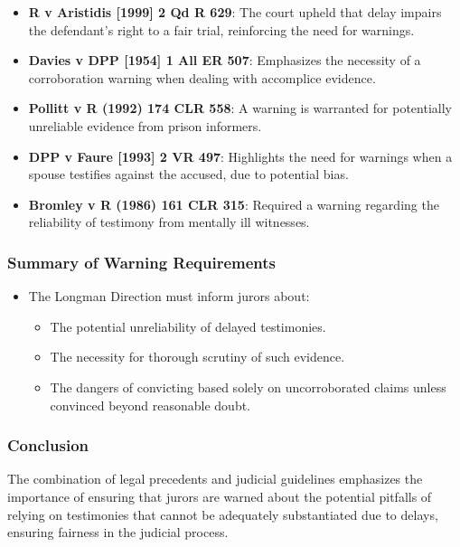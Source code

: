 \begin{itemize}
\item
  \textbf{R v Aristidis {[}1999{]} 2 Qd R 629}: The court upheld that
  delay impairs the defendant's right to a fair trial, reinforcing the
  need for warnings.
\item
  \textbf{Davies v DPP {[}1954{]} 1 All ER 507}: Emphasizes the
  necessity of a corroboration warning when dealing with accomplice
  evidence.
\item
  \textbf{Pollitt v R (1992) 174 CLR 558}: A warning is warranted for
  potentially unreliable evidence from prison informers.
\item
  \textbf{DPP v Faure {[}1993{]} 2 VR 497}: Highlights the need for
  warnings when a spouse testifies against the accused, due to potential
  bias.
\item
  \textbf{Bromley v R (1986) 161 CLR 315}: Required a warning regarding
  the reliability of testimony from mentally ill witnesses.
\end{itemize}

\subsubsection{Summary of Warning
Requirements}\label{summary-of-warning-requirements}

\begin{itemize}
\tightlist
\item
  The Longman Direction must inform jurors about:

  \begin{itemize}
  \tightlist
  \item
    The potential unreliability of delayed testimonies.
  \item
    The necessity for thorough scrutiny of such evidence.
  \item
    The dangers of convicting based solely on uncorroborated claims
    unless convinced beyond reasonable doubt.
  \end{itemize}
\end{itemize}

\subsubsection{Conclusion}\label{conclusion-1}

The combination of legal precedents and judicial guidelines emphasizes
the importance of ensuring that jurors are warned about the potential
pitfalls of relying on testimonies that cannot be adequately
substantiated due to delays, ensuring fairness in the judicial process.

